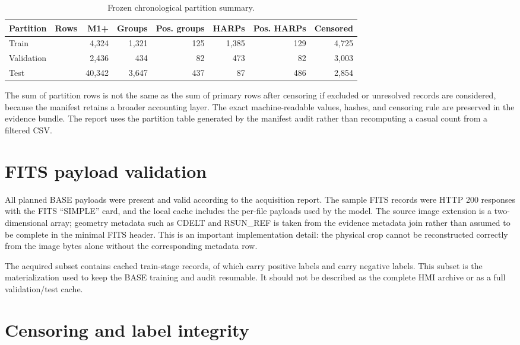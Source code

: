 \documentclass[11pt,oneside]{report}
\begin{document}
\begin{table}[H]
\centering
\caption{Frozen chronological partition summary.}
\label{tab:partitions}
\begin{tabular}{lrrrrrrr}
\toprule
Partition & Rows & M1+ & Groups & Pos. groups & HARPs & Pos. HARPs & Censored \\
\midrule
Train & \TrainRows{} & 4,324 & 1,321 & 125 & 1,385 & 129 & 4,725 \\
Validation & \ValidationRows{} & 2,436 & 434 & 82 & 473 & 82 & 3,003 \\
Test & \TestRows{} & 40,342 & 3,647 & 437 & 87 & 486 & 2,854 \\
\bottomrule
\end{tabular}
\end{table}

The sum of partition rows is not the same as the sum of primary rows after censoring if excluded or unresolved records are considered, because the manifest retains a broader accounting layer. The exact machine-readable values, hashes, and censoring rule are preserved in the evidence bundle. The report uses the partition table generated by the manifest audit rather than recomputing a casual count from a filtered CSV.

\section{FITS payload validation}

All \AcquiredCount{} planned BASE payloads were present and valid according to the acquisition report. The sample FITS records were HTTP 200 responses with the FITS ``SIMPLE'' card, and the local cache includes the per-file payloads used by the model. The source image extension is a two-dimensional array; geometry metadata such as CDELT and RSUN\_REF is taken from the evidence metadata join rather than assumed to be complete in the minimal FITS header. This is an important implementation detail: the physical crop cannot be reconstructed correctly from the image bytes alone without the corresponding metadata row.

The acquired subset contains \AcquiredTrainFiles{} cached train-stage records, of which \AcquiredPositiveFiles{} carry positive labels and \AcquiredNegativeFiles{} carry negative labels. This subset is the materialization used to keep the BASE training and audit resumable. It should not be described as the complete HMI archive or as a full validation/test cache.

\section{Censoring and label integrity}
\end{document}

